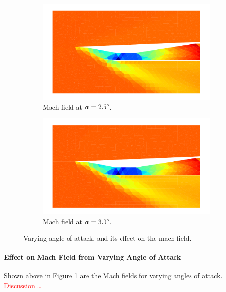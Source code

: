 \begin{figure}[h]
    \begin{subfigure}[h]{0.48\linewidth}
        \centering
        \includegraphics[width=\linewidth]{rep/q5/mach_a25.pdf}
        \caption{Mach field at $\alpha=2.5\degree$.}
    \end{subfigure}
    \begin{subfigure}[h]{0.48\linewidth}
        \centering
        \includegraphics[width=\linewidth]{rep/q5/mach_a30.pdf}
        \caption{Mach field at $\alpha=3.0\degree$.}
    \end{subfigure}
    \caption[Mach Field with Varying Angle of Attack]{Varying angle of attack, and its effect on the mach field.}
    \label{fig:mach_fields}
\end{figure}

\paragraph{Effect on Mach Field from Varying Angle of Attack} Shown above in Figure \ref{fig:mach_fields} are the Mach fields for varying angles of attack. \textcolor{red}{Discussion \ldots}

